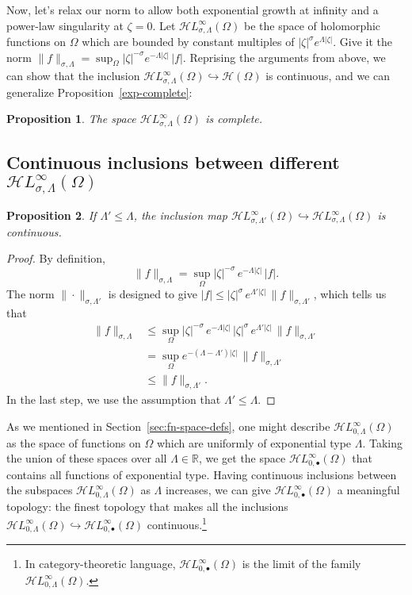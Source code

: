 \documentclass{article}
\theoremstyle{plain}
\newtheorem{prop}{Proposition}
\newcommand{\R}{\mathbb{R}}
\newcommand{\holo}{\mathcal{H}}
\newcommand{\singexp}[2]{\mathcal{H}L^\infty_{#1, #2}}
\newcommand{\singexpalg}[1]{\singexp{#1}{\bullet}}
\newcommand{\domain}{\Omega}
\begin{document}
Now, let's relax our norm to allow both exponential growth at infinity and a power-law singularity at $\zeta = 0$. Let $\singexp{\sigma}{\Lambda}(\Omega)$ be the space of holomorphic functions on $\Omega$ which are bounded by constant multiples of $|\zeta|^\sigma e^{\Lambda|\zeta|}$. Give it the norm $\|f\|_{\sigma,\Lambda} = \sup_\Omega |\zeta|^{-\sigma} e^{-\Lambda|\zeta|}\,|f|$. Reprising the arguments from above, we can show that the inclusion $\singexp{\sigma}{\Lambda}(\Omega) \hookrightarrow \holo(\Omega)$ is continuous, and we can generalize Proposition~\ref{exp-complete}:
\begin{prop}
The space $\singexp{\sigma}{\Lambda}(\Omega)$ is complete.
\end{prop}

\subsection{Continuous inclusions between different $\singexp{\sigma}{\Lambda}(\Omega)$}\label{sec:inclusions}
\begin{prop}\label{prop:inclus-ge-exp}
If $\Lambda'\leq\Lambda$, the inclusion map $\singexp{\sigma}{\Lambda'}(\Omega)\hookrightarrow \singexp{\sigma}{\Lambda}(\Omega)$ is continuous.
\end{prop}
\begin{proof}
By definition,
\[ \|f\|_{\sigma,\Lambda}=\sup_{\Omega} |\zeta|^{-\sigma}\,e^{-\Lambda |\zeta|}\, |f|. \]
The norm $\|\cdot\|_{\sigma, \Lambda'}$ is designed to give $|f| \le |\zeta|^\sigma\,e^{\Lambda'|\zeta|}\,\|f\|_{\sigma, \Lambda'}$, which tells us that
\begin{align*}
\|f\|_{\sigma,\Lambda} & \leq \sup_{\Omega} |\zeta|^{-\sigma}\,e^{-\Lambda |\zeta|}\,|\zeta|^\sigma\,e^{\Lambda'|\zeta|}\,\|f\|_{\sigma, \Lambda'}\\
&=\sup_{\Omega} e^{-(\Lambda-\Lambda') |\zeta|}\,\|f\|_{\sigma, \Lambda'}\\
&\leq \|f\|_{\sigma,\Lambda'}.
\end{align*}
In the last step, we use the assumption that $\Lambda' \le \Lambda$.
\end{proof}
As we mentioned in Section~\ref{sec:fn-space-defs}, one might describe $\singexp{0}{\Lambda}(\domain)$ as the space of functions on $\domain$ which are uniformly of exponential type $\Lambda$. Taking the union of these spaces over all $\Lambda \in \R$, we get the space $\singexpalg{0}(\domain)$ that contains all functions of exponential type. Having continuous inclusions between the subspaces $\singexp{0}{\Lambda}(\domain)$ as $\Lambda$ increases, we can give $\singexpalg{0}(\domain)$ a meaningful topology: the finest topology that makes all the inclusions $\singexp{0}{\Lambda}(\domain) \hookrightarrow \singexpalg{0}(\domain)$ continuous.\footnote{In category-theoretic language, $\singexpalg{0}(\domain)$ is the limit of the family $\singexp{0}{\Lambda}(\domain)$.}
\end{document}
